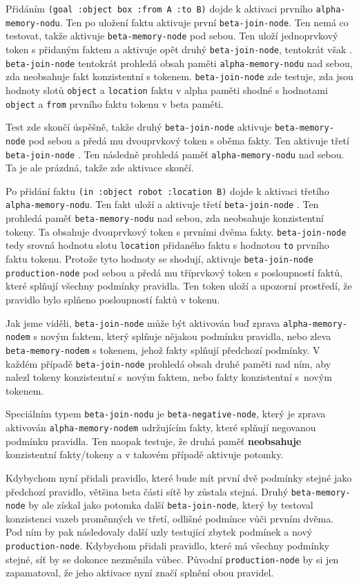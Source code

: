 Přidáním \verb|(goal :object box :from A :to B)| dojde k aktivaci prvního
\verb|alpha-memory-nodu|. Ten po uložení faktu aktivuje první
\verb|beta-join-node|. Ten nemá co testovat, takže aktivuje
\verb|beta-memory-node| pod sebou. Ten uloží jednoprvkový token s přidaným
faktem a aktivuje opět druhý \verb|beta-join-node|, tentokrát však .
\verb|beta-join-node| tentokrát prohledá obsah paměti \verb|alpha-memory-nodu|
nad sebou, zda neobsahuje fakt konzistentní s tokenem. \verb|beta-join-node| zde
testuje, zda jsou hodnoty slotů \verb|object| a \verb|location| faktu v alpha
paměti shodné s hodnotami \verb|object| a \verb|from| prvního faktu tokenu v
beta paměti.

Test zde skončí úspěšně, takže druhý \verb|beta-join-node| aktivuje
\verb|beta-memory-node| pod sebou a předá mu dvouprvkový token s oběma fakty.
Ten aktivuje třetí \verb|beta-join-node| . Ten následně prohledá paměť
\verb|alpha-memory-nodu| nad sebou. Ta je ale prázdná, takže zde aktivace
skončí.

Po přidání faktu \verb|(in :object robot :location B)| dojde k aktivaci třetího
\verb|alpha-memory-nodu|. Ten fakt uloží a aktivuje třetí \verb|beta-join-node|
. Ten prohledá paměť \verb|beta-memory-nodu| nad sebou, zda
neobsahuje konzistentní tokeny. Ta obsahuje dvouprvkový token s prvními dvěma
fakty. \verb|beta-join-node| tedy srovná hodnotu slotu \verb|location| přidaného
faktu s hodnotou \verb|to| prvního faktu tokenu. Protože tyto hodnoty se
shodují, aktivuje \verb|beta-join-node| \verb|production-node| pod sebou a předá
mu tříprvkový token s posloupností faktů, které splňují všechny podmínky
pravidla. Ten token uloží a upozorní prostředí, že pravidlo bylo splňeno
posloupností faktů v tokenu.

Jak jsme viděli, \verb|beta-join-node| může být aktivován buď zprava
\verb|alpha-memory-nodem| s novým faktem, který splňuje nějakou podmínku
pravidla, nebo zleva \verb|beta-memory-nodem| s tokenem, jehož fakty splňují
předchozí podmínky. V každém případě \verb|beta-join-node| prohledá obsah druhé
paměti nad ním, aby nalezl tokeny konzistentní s~novým faktem, nebo fakty
konzistentní s~novým tokenem.

Speciálním typem \verb|beta-join-nodu| je \verb|beta-negative-node|, který je
zprava aktivován \verb|alpha-memory-nodem| udržujícím fakty, které splňují
negovanou podmínku pravidla. Ten naopak testuje, že druhá paměť
\textbf{neobsahuje} konzistentní fakty/tokeny a v takovém případě aktivuje
potomky.

Kdybychom nyní přidali pravidlo, které bude mít první dvě podmínky stejné jako
předchozí pravidlo, většina beta části sítě by zůstala stejná. Druhý
\verb|beta-memory-node| by ale získal jako potomka další \verb|beta-join-node|,
který by testoval konzistenci vazeb proměnných ve třetí, odlišné podmínce vůči
prvním dvěma. Pod ním by pak následovaly další uzly testující zbytek podmínek a
nový \verb|production-node|. Kdybychom přidali pravidlo, které má všechny
podmínky stejné, síť by se dokonce nezměnila vůbec. Původní
\verb|production-node| by si jen zapamatoval, že jeho aktivace nyní značí splnění
obou pravidel.
